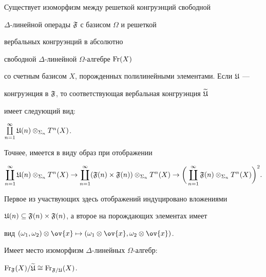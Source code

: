 \begin{thm}


Существует изоморфизм между решеткой конгруэнций свободной


$\Delta$-линейной операды $\frak F$ с базисом $\Omega$ и решеткой


вербальных конгруэнций в абсолютно


свободной $\Delta$-линейной $\Omega$-алгебре $\operatorname{Fr}(X)$


со счетным базисом $X$, порожденных полилинейными элементами. Если $\frak U$ ---


конгруэнция в $\frak F$, то соответствующая вербальная конгруэнция $\widetilde{\frak U}$


имеет следующий вид\/$:$


$\coprod\limits_{n=1}^{\infty} \frak U(n)\otimes_{\Sigma_n} T^n(X)$.


Точнее, имеется в виду образ при отображении


$$


\coprod_{n=1}^{\infty} \U(n)\otimes_{\sym_n} T^n(X)


\rightarrow


\coprod_{n=1}^{\infty}


(\F(n)\times \F(n))\otimes_{\sym_n} T^n(X)


\rightarrow


\bigg(\coprod_{n=1}^{\infty} \F(n)\otimes_{\sym_n} T^n(X)\bigg)^2.


$$


Первое из участвующих здесь отображений индуцировано вложениями


$\frak U(n)\subseteq \frak F(n)\times \frak F(n)$, а второе на порождающих элементах имеет


вид $(\o_1,\o_2)\otimes\ov{x}\mapsto(\o_1\otimes\ov{x},\o_2\otimes \ov{x})$.


Имеет место изоморфизм $\Delta$-линейных $\Omega$-алгебр\/$:$


$\operatorname{Fr}_{\frak F}(X)/\widetilde{\frak U}\cong \operatorname{Fr}_{\frak F/\frak U}(X)$.


\end{thm}





